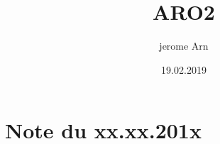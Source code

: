 \documentclass{article}
\title{ARO2}
\author{jerome Arn}
\date{19.02.2019}
\begin{document}
\maketitle
\newpage

\tableofcontents
\newpage

\section{Note du xx.xx.201x}
\end{document}

